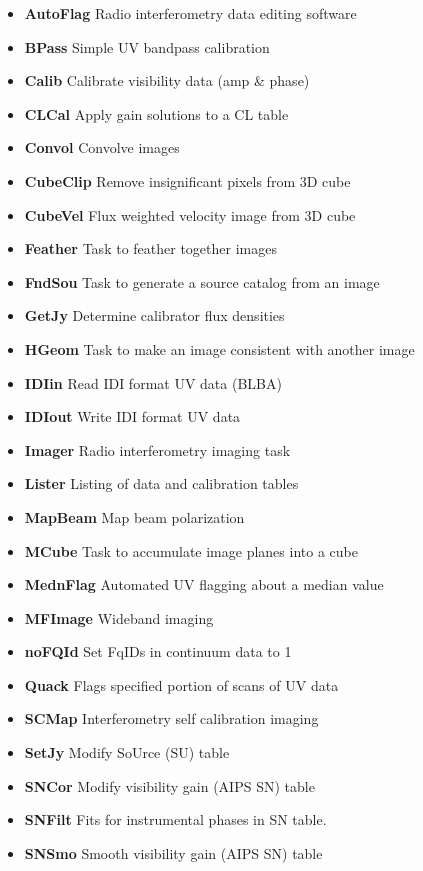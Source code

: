 \documentclass[11pt]{report}
\begin{document}
\begin{itemize}
\item {\bf AutoFlag}  Radio interferometry data editing software
\item {\bf BPass}     Simple UV bandpass calibration
\item {\bf Calib}     Calibrate visibility data (amp \& phase)
\item {\bf CLCal}     Apply gain solutions to a CL table
\item {\bf Convol}    Convolve images
\item {\bf CubeClip}  Remove insignificant pixels from 3D cube
\item {\bf CubeVel}   Flux weighted velocity image from 3D cube
\item {\bf Feather}   Task to feather together images
\item {\bf FndSou}    Task to generate a source catalog from an image
\item {\bf GetJy}     Determine calibrator flux densities
\item {\bf HGeom}     Task to make an image consistent with another image
\item {\bf IDIin}     Read IDI format UV data (BLBA)
\item {\bf IDIout}    Write IDI format UV data
\item {\bf Imager}    Radio interferometry imaging task
\item {\bf Lister}    Listing of data and calibration tables
\item {\bf MapBeam}   Map beam polarization
\item {\bf MCube}     Task to accumulate image planes into a cube
\item {\bf MednFlag}  Automated UV flagging about a median value
\item {\bf MFImage}   Wideband imaging
\item {\bf noFQId}    Set FqIDs in continuum data to 1
\item {\bf Quack}     Flags specified portion of scans of UV data
\item {\bf SCMap}     Interferometry self calibration imaging
\item {\bf SetJy}     Modify SoUrce (SU) table
\item {\bf SNCor}     Modify visibility gain (AIPS SN) table
\item {\bf SNFilt}    Fits for instrumental phases in SN table.
\item {\bf SNSmo}     Smooth visibility gain (AIPS SN) table

\end{itemize}
\end{document}
